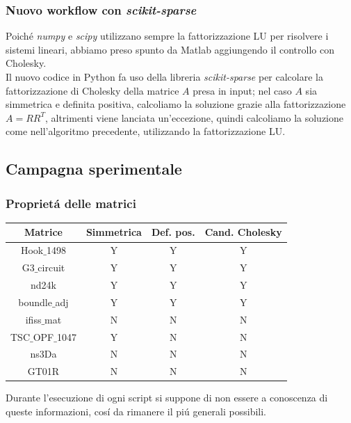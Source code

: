 \documentclass{beamer}
\begin{document}
\begin{frame}
\frametitle{Nuovo workflow con \textit{scikit-sparse}}
Poich\'e \textit{numpy} e \textit{scipy} utilizzano sempre la fattorizzazione LU per risolvere i sistemi lineari, abbiamo preso spunto da Matlab aggiungendo il controllo con Cholesky.\\
Il nuovo codice in Python fa uso della libreria \textit{scikit-sparse} per calcolare la fattorizzazione di Cholesky della matrice $A$ presa in input; nel caso $A$ sia simmetrica e definita positiva, calcoliamo la soluzione grazie alla fattorizzazione $A = RR^T$, altrimenti viene lanciata un'eccezione, quindi calcoliamo la soluzione come nell'algoritmo precedente, utilizzando la fattorizzazione LU.
\end{frame}

\subsection{Campagna sperimentale}

\begin{frame}
\frametitle{Propriet\'a delle matrici}
\begin{table}
\begin{tabular}{c c c c}
\toprule
\textbf{Matrice} & \textbf{Simmetrica} & \textbf{Def. pos.} & \textbf{Cand. Cholesky}\\
\midrule
Hook$\_$1498 & Y & Y & Y\\
 G3$\_$circuit & Y & Y & Y\\
 nd24k & Y & Y & Y\\
 boundle$\_$adj & Y & Y & Y\\
 ifiss$\_$mat & N & N & N\\
 TSC$\_$OPF$\_$1047 & Y & N & N\\
 ns3Da & N & N & N\\
 GT01R & N & N & N \\
\bottomrule
\end{tabular}
\end{table}
Durante l'esecuzione di ogni script si suppone di non essere a conoscenza di queste informazioni, cos\'i da rimanere il pi\'u generali possibili.
\end{frame}
\end{document}
